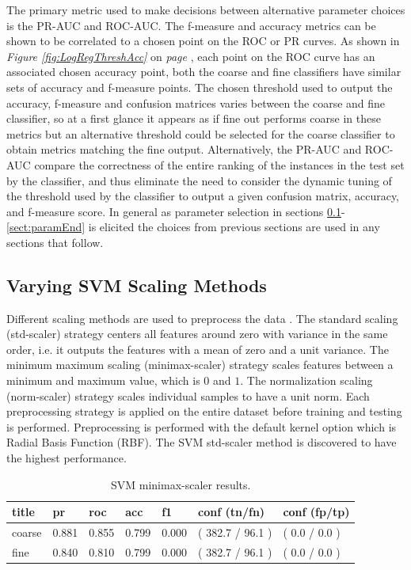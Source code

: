 \documentclass[ms]{nuthesis}
\begin{document}
\par The primary metric used to make decisions between alternative parameter choices is the PR-AUC and
ROC-AUC. The f-measure and accuracy metrics can be shown to be correlated to a chosen point on the ROC or
PR curves. As shown in \textit{Figure \ref{fig:LogRegThreshAcc}} on \textit{page \pageref{fig:LogRegThreshAcc}},
each point on the ROC curve has an associated chosen accuracy point, both the coarse and fine classifiers have similar
sets of accuracy and f-measure points. The chosen threshold used to output the accuracy, f-measure and confusion matrices
varies between the coarse and fine classifier, so at a first glance it appears as if fine out performs coarse in these
metrics but an alternative threshold could be selected for the coarse classifier to obtain metrics matching the fine
output. Alternatively, the PR-AUC and ROC-AUC compare the correctness of the entire ranking of the
instances in the test set by the classifier, and thus eliminate the need to consider the dynamic tuning of the threshold
used by the classifier to output a given confusion matrix, accuracy, and f-measure score. In general
 as parameter selection in sections \ref{sect:paramStart}-\ref{sect:paramEnd} is
elicited the choices from previous sections
are used in any sections that follow.



\subsection{Varying SVM Scaling Methods}
\label{sect:paramStart}
\par Different scaling methods are used to preprocess the data
\cite{scikit-learn}. The standard scaling (std-scaler) strategy
centers all features around zero with variance in the same order, i.e. it
outputs the features with a mean of zero
and a unit variance. The minimum maximum scaling (minimax-scaler) strategy scales features between a minimum and maximum value,
which is $0$ and $1$. The normalization scaling (norm-scaler) strategy scales individual
samples to have a unit norm. Each
preprocessing strategy is applied on the entire dataset before training and testing
is performed. Preprocessing is performed
with the default kernel option which is Radial Basis Function (RBF). The SVM std-scaler method
is discovered to have the highest performance.

\FloatBarrier

\begin{table}[H]
\centering
\caption{SVM minimax-scaler results.}
\label{tab:SVMMinMax}
\begin{tabular}{|l||l||l||l||l||l||l|}\toprule
title & pr & roc & acc & f1 & conf (tn/fn) & conf (fp/tp) \\ \midrule
coarse & 0.881 & 0.855 & 0.799 & 0.000 & ( 382.7 / 96.1 ) & ( 0.0 / 0.0 ) \\
fine & 0.840 & 0.810 & 0.799 & 0.000 & ( 382.7 / 96.1 ) & ( 0.0 / 0.0 ) \\ \bottomrule
\end{tabular}
\end{table}
\FloatBarrier
\end{document}
